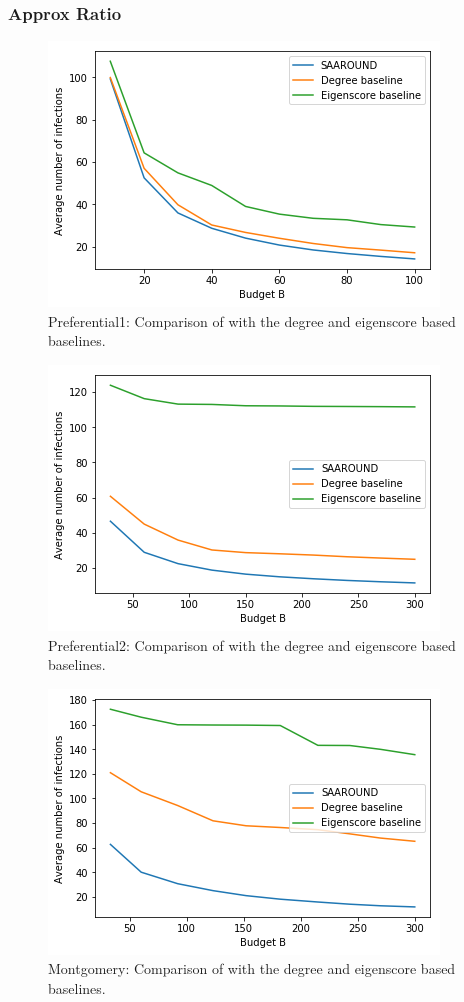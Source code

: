 \subsubsection{Approx Ratio}
\begin{figure}[!h]
    \centering
    \includegraphics[scale = 0.55]{Figuresnew/pa1_obj.png}
    \caption{Preferential1: Comparison of \algo{} with the degree and eigenscore based baselines.}
    \label{fig:pa1approx}
\end{figure}

\begin{figure}[!h]
    \centering
    \includegraphics[scale = 0.55]{Figuresnew/pa2_obj.png}
    \caption{Preferential2: Comparison of \algo{} with the degree and eigenscore based baselines.}
    \label{fig:pa1approx}
\end{figure}

\begin{figure}[!h]
    \centering
    \includegraphics[scale = 0.55]{Figuresnew/mont_obj.png}
    \caption{Montgomery: Comparison of \algo{} with the degree and eigenscore based baselines.}
    \label{fig:pa1approx}
\end{figure}
